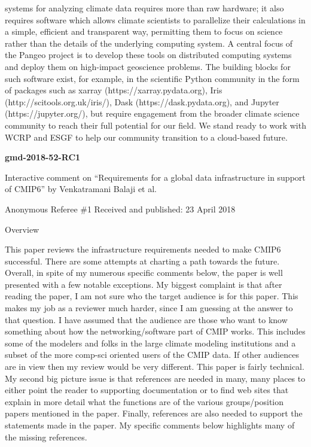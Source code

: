 \documentclass[gmd,manuscript]{copernicus}
\begin{document}
systems for analyzing climate data requires more than raw hardware; it
also requires software which allows climate scientists to parallelize
their calculations in a simple, efficient and transparent way,
permitting them to focus on science rather than the details of the
underlying computing system. A central focus of the Pangeo project is
to develop these tools on distributed computing systems and deploy
them on high-impact geoscience problems. The building blocks for such
software exist, for example, in the scientific Python community in the
form of packages such as xarray (https://xarray.pydata.org), Iris
(http://scitools.org.uk/iris/), Dask (https://dask.pydata.org), and
Jupyter (https://jupyter.org/), but require engagement from the
broader climate science community to reach their full potential for
our field. We stand ready to work with WCRP and ESGF to help our
community transition to a cloud-based future.

\pagebreak


\textbf{gmd-2018-52-RC1}

Interactive comment on “Requirements for a global data infrastructure
in support of CMIP6” by Venkatramani Balaji et al.

Anonymous Referee \#1
Received and published: 23 April 2018

Overview

This paper reviews the infrastructure requirements needed to make
CMIP6 successful. There are some attempts at charting a path towards
the future. Overall, in spite of my numerous specific comments below,
the paper is well presented with a few notable exceptions. My biggest
complaint is that after reading the paper, I am not sure who the
target audience is for this paper. This makes my job as a reviewer
much harder, since I am guessing at the answer to that question. I
have assumed that the audience are those who want to know something
about how the networking/software part of CMIP works. This includes
some of the modelers and folks in the large climate modeling
institutions and a subset of the more comp-sci oriented users of the
CMIP data. If other audiences are in view then my review would be very
different. This paper is fairly technical. My second big picture issue
is that references are needed in many, many places to either point the
reader to supporting documentation or to find web sites that explain
in more detail what the functions are of the various groups/position
papers mentioned in the paper. Finally, references are also needed to
support the statements made in the paper. My specific comments below
highlights many of the missing references.
\end{document}
